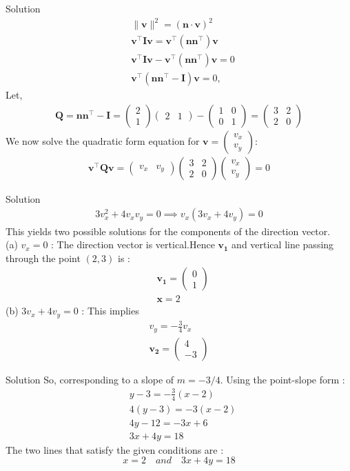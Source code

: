 \documentclass{beamer}
\newcommand{\myvec}[1]{\ensuremath{\begin{pmatrix}#1\end{pmatrix}}}
\begin{document}
\begin{frame}{Solution}
\begin{align} 
	&\|\mathbf{v}\|^2 = (\mathbf{n} \cdot \mathbf{v})^2 \\
	&\mathbf{v}^\top\mathbf{I}\mathbf{v} = \mathbf{v}^\top(\mathbf{n}\mathbf{n}^\top)\mathbf{v} \\
	&\mathbf{v}^\top\mathbf{I}\mathbf{v} - \mathbf{v}^\top(\mathbf{n}\mathbf{n}^\top)\mathbf{v} = 0\\
	&\mathbf{v}^\top (\mathbf{n}\mathbf{n}^\top - \mathbf{I}) \mathbf{v} = 0, 
\end{align}
Let,
\begin{align}
	\mathbf{Q} = \mathbf{n}\mathbf{n}^\top - \mathbf{I} = \myvec{2 \\ 1} \myvec{2 & 1} - \myvec{1 & 0 \\ 0 & 1} = \myvec{3 & 2 \\ 2 & 0} 
\end{align}
We now solve the quadratic form equation for $\mathbf{v} = \myvec{v_x \\ v_y}$:
\begin{align} \mathbf{v}^\top \mathbf{Q} \mathbf{v} = \myvec{v_x & v_y} \myvec{3 & 2 \\ 2 & 0} \myvec{v_x \\ v_y} = 0 \end{align}
\end{frame}

\begin{frame}{Solution}
\begin{align} 
	3v_x^2 + 4v_xv_y = 0 \implies v_x(3v_x + 4v_y) = 0 
\end{align}
This yields two possible solutions for the components of the direction vector.\\
(a) $v_x = 0$ : The direction vector is vertical.Hence $\mathbf{v_1}$ and vertical line passing through the point $(2, 3)$ is :
\begin{align} 
	&\mathbf{v_1} = \myvec{0 \\ 1}\\
	&\mathbf{x} = 2 
\end{align}
(b) $3v_x + 4v_y = 0$ : This implies \begin{align}
	v_y = -\frac{3}{4}v_x\\
	\mathbf{v_2} = \myvec{4 \\ -3}
\end{align}
\end{frame}

\begin{frame}{Solution}
So, corresponding to a slope of $m = -3/4$. Using the point-slope form :
\begin{align}
	&y - 3 = -\frac{3}{4}(x - 2) \\
	&4(y - 3) = -3(x - 2) \\
	&4y - 12 = -3x + 6 \\
	&3x + 4y = 18
\end{align}
The two lines that satisfy the given conditions are :
\[	x = 2 \quad and\quad
3x + 4y = 18 \]
\end{frame}
\end{document}
